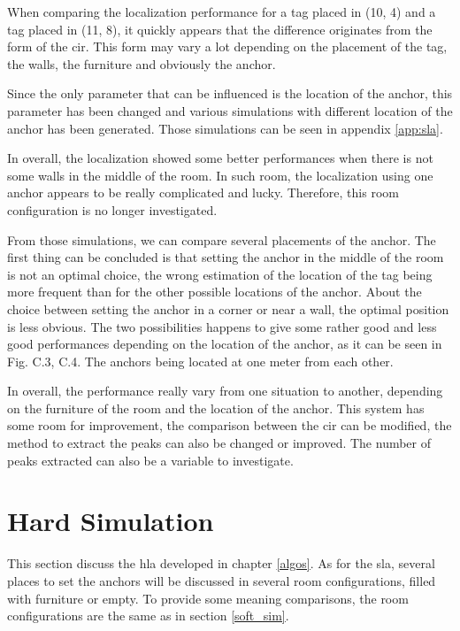 When comparing the localization performance for a tag placed in (10, 4) and a tag placed in (11, 8), it quickly appears that the difference originates from the form of the \gls{cir}. This form may vary a lot depending on the placement of the tag,  the walls, the furniture and obviously the anchor. 
\vspace{2mm}

Since the only parameter that can be influenced is the location of the anchor, this parameter has been changed and various simulations with different location of the anchor has been generated. Those simulations can be seen in appendix \ref{app:sla}.
\vspace{2mm}

In overall, the localization showed some better performances when there is not some walls in the middle of the room. In such room, the localization using one anchor appears to be really complicated and lucky. Therefore, this room configuration is no longer investigated.
\vspace{2mm}

From those simulations, we can compare several placements of the anchor. The first thing can be concluded is that setting the anchor in the middle of the room is not an optimal choice, the wrong estimation of the location of the tag being more frequent than for the other possible locations of the anchor. About the choice between setting the anchor in a corner or near a wall, the optimal position is less obvious. The two possibilities happens to give some rather good and less good performances depending on the location of the anchor, as it can be seen in Fig. C.3, C.4. The anchors being located at one meter from each other.
\vspace{2mm}

In overall, the performance really vary from one situation to another, depending on the furniture of the room and the location of the anchor. This system has some room for improvement, the comparison between the \gls{cir} can be modified, the method to extract the peaks can also be changed or improved. The number of peaks extracted can also be a variable to investigate.


\section{Hard Simulation}

This section discuss the \gls{hla} developed in chapter \ref{algos}. As for the \gls{sla}, several places to set the anchors will be discussed in several room configurations, filled with furniture or empty. To provide some meaning comparisons, the room configurations are the same as in section \ref{soft_sim}.

